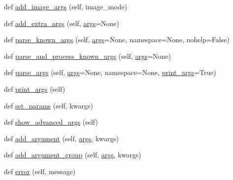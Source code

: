 \begin{DoxyCompactItemize}
\item 
def \hyperlink{classparlai_1_1core_1_1params_1_1ParlaiParser_a33d186a0cd665df88726b96f1bc3d88e}{add\+\_\+image\+\_\+args} (self, image\+\_\+mode)
\item 
def \hyperlink{classparlai_1_1core_1_1params_1_1ParlaiParser_ade9c068595c2b1110d019f3dedeb79ba}{add\+\_\+extra\+\_\+args} (self, \hyperlink{classparlai_1_1core_1_1params_1_1ParlaiParser_a27d35bfa073588bf887cbdbf45c19f39}{args}=None)
\item 
def \hyperlink{classparlai_1_1core_1_1params_1_1ParlaiParser_a2a98c07f7393108ad67773951038f191}{parse\+\_\+known\+\_\+args} (self, \hyperlink{classparlai_1_1core_1_1params_1_1ParlaiParser_a27d35bfa073588bf887cbdbf45c19f39}{args}=None, namespace=None, nohelp=False)
\item 
def \hyperlink{classparlai_1_1core_1_1params_1_1ParlaiParser_a0409771a420d08fb51a792a089806c70}{parse\+\_\+and\+\_\+process\+\_\+known\+\_\+args} (self, \hyperlink{classparlai_1_1core_1_1params_1_1ParlaiParser_a27d35bfa073588bf887cbdbf45c19f39}{args}=None)
\item 
def \hyperlink{classparlai_1_1core_1_1params_1_1ParlaiParser_ad549d75e2808d63fbc5c5d0e30682f18}{parse\+\_\+args} (self, \hyperlink{classparlai_1_1core_1_1params_1_1ParlaiParser_a27d35bfa073588bf887cbdbf45c19f39}{args}=None, namespace=None, \hyperlink{classparlai_1_1core_1_1params_1_1ParlaiParser_adb1dec3d3433b40209bb2c24722df335}{print\+\_\+args}=True)
\item 
def \hyperlink{classparlai_1_1core_1_1params_1_1ParlaiParser_adb1dec3d3433b40209bb2c24722df335}{print\+\_\+args} (self)
\item 
def \hyperlink{classparlai_1_1core_1_1params_1_1ParlaiParser_a6f1dc42e86af57a7fc4ef9a4c68ca247}{set\+\_\+params} (self, kwargs)
\item 
def \hyperlink{classparlai_1_1core_1_1params_1_1ParlaiParser_a3a75bdeee002ed5a50706f1a6c9797c8}{show\+\_\+advanced\+\_\+args} (self)
\item 
def \hyperlink{classparlai_1_1core_1_1params_1_1ParlaiParser_a3ecf246ac5ed40769d313a2db962b43e}{add\+\_\+argument} (self, \hyperlink{classparlai_1_1core_1_1params_1_1ParlaiParser_a27d35bfa073588bf887cbdbf45c19f39}{args}, kwargs)
\item 
def \hyperlink{classparlai_1_1core_1_1params_1_1ParlaiParser_a2855a5676bf638bfc9491577e603eee3}{add\+\_\+argument\+\_\+group} (self, \hyperlink{classparlai_1_1core_1_1params_1_1ParlaiParser_a27d35bfa073588bf887cbdbf45c19f39}{args}, kwargs)
\item 
def \hyperlink{classparlai_1_1core_1_1params_1_1ParlaiParser_a8d0cb15ecc35f82c94b5a19c2a6a9d12}{error} (self, message)
\end{DoxyCompactItemize}
